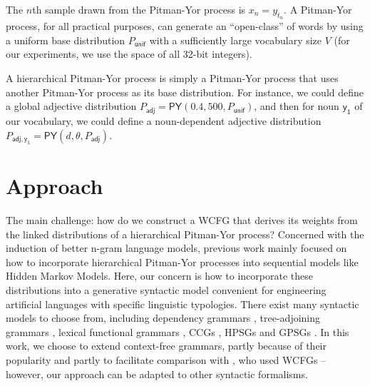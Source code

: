 \documentclass[11pt]{article}
\renewcommand{\bnfpn}[1]{\mathsf{#1}}
\begin{document}
\noindent The $n$th sample drawn from the Pitman-Yor process is $x_n = y_{t_n}$. A Pitman-Yor process, for all practical purposes, can generate an ``open-class'' of words by using a uniform base distribution $P_{\mathsf{unif}}$ with a sufficiently large vocabulary size $V$ (for our experiments, we use the space of all 32-bit integers). 

A hierarchical Pitman-Yor process is simply a Pitman-Yor process that uses another Pitman-Yor process as its base distribution. For instance, we could define a global adjective distribution $P_\mathsf{adj} = \mathsf{PY}(0.4, 500, P_{\mathsf{unif}})$, and then for noun $\bnfpn{y_1}$ of our vocabulary, we could define a noun-dependent adjective distribution $P_\mathsf{\bnfpn{adj, y_1}} = \mathsf{PY}(d, \theta, P_\mathsf{adj})$. 





\section{Approach}

The main challenge: how do we construct a WCFG that derives its weights from the linked distributions of a hierarchical Pitman-Yor process? Concerned with the induction of better n-gram language models, previous work \cite{teh-2006-hierarchical,blunsom-cohn-2011-hierarchical} mainly focused on how to incorporate hierarchical Pitman-Yor processes into sequential models like Hidden Markov Models. Here, our concern is how to incorporate these distributions into a generative syntactic model convenient for engineering artificial languages with specific linguistic typologies. There exist many syntactic models to choose from, including dependency grammars \cite{eisner-1996-three}, tree-adjoining grammars \cite{joshi1987introduction}, lexical functional grammars \cite{kaplan-1985-structural}, CCGs \cite{steedman2011combinatory}, HPSGs \cite{pollard1994head} and GPSGs \cite{gazdar1985generalized}. In this work, we choose to extend context-free grammars, partly because of their popularity and partly to facilitate comparison with \cite{white-cotterell-2021-examining}, who used WCFGs -- however, our approach can be adapted to other syntactic formalisms.
\end{document}
